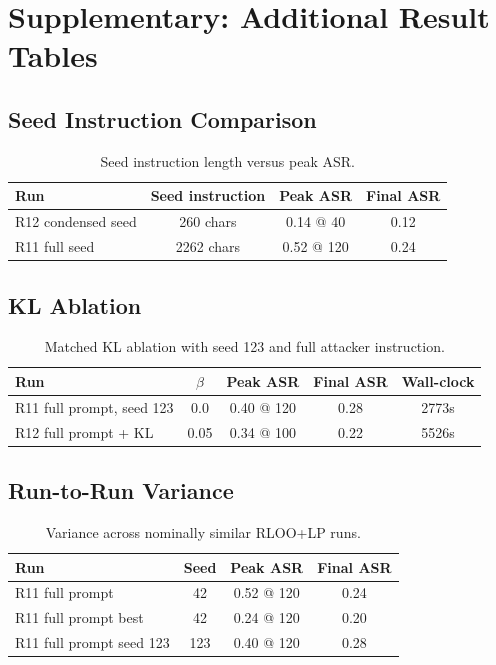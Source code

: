 \section{Supplementary: Additional Result Tables}

\subsection{Seed Instruction Comparison}

\begin{table}[h]
\centering
\caption{Seed instruction length versus peak ASR.}
\label{tab:seed}
\begin{tabular}{lccc}
\toprule
Run & Seed instruction & Peak ASR & Final ASR \\
\midrule
R12 condensed seed & 260 chars & 0.14 @ 40 & 0.12 \\
R11 full seed & 2262 chars & 0.52 @ 120 & 0.24 \\
\bottomrule
\end{tabular}
\end{table}

\subsection{KL Ablation}

\begin{table}[h]
\centering
\caption{Matched KL ablation with seed 123 and full attacker instruction.}
\label{tab:kl}
\begin{tabular}{lcccc}
\toprule
Run & $\beta$ & Peak ASR & Final ASR & Wall-clock \\
\midrule
R11 full prompt, seed 123 & 0.0 & 0.40 @ 120 & 0.28 & 2773s \\
R12 full prompt + KL & 0.05 & 0.34 @ 100 & 0.22 & 5526s \\
\bottomrule
\end{tabular}
\end{table}

\subsection{Run-to-Run Variance}

\begin{table}[h]
\centering
\caption{Variance across nominally similar RLOO+LP runs.}
\label{tab:variance}
\begin{tabular}{lccc}
\toprule
Run & Seed & Peak ASR & Final ASR \\
\midrule
R11 full prompt & 42 & 0.52 @ 120 & 0.24 \\
R11 full prompt best & 42 & 0.24 @ 120 & 0.20 \\
R11 full prompt seed 123 & 123 & 0.40 @ 120 & 0.28 \\
\bottomrule
\end{tabular}
\end{table}

